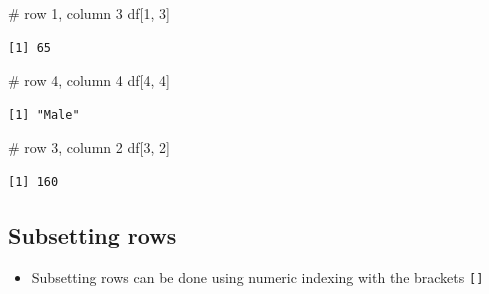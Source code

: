 \documentclass[
  letterpaper,
  DIV=11,
  numbers=noendperiod]{scrreprt}
\newenvironment{Shaded}{\begin{snugshade}}{\end{snugshade}}
\newcommand{\CommentTok}[1]{\textcolor[rgb]{0.37,0.37,0.37}{#1}}
\newcommand{\DecValTok}[1]{\textcolor[rgb]{0.68,0.00,0.00}{#1}}
\newcommand{\NormalTok}[1]{\textcolor[rgb]{0.00,0.23,0.31}{#1}}
\providecommand{\tightlist}{%
  \setlength{\itemsep}{0pt}\setlength{\parskip}{0pt}}\usepackage{longtable,booktabs,array}
\begin{document}
\begin{tcolorbox}[enhanced jigsaw, colbacktitle=quarto-callout-tip-color!10!white, opacitybacktitle=0.6, breakable, left=2mm, leftrule=.75mm, toprule=.15mm, toptitle=1mm, bottomtitle=1mm, colframe=quarto-callout-tip-color-frame, opacityback=0, coltitle=black, arc=.35mm, titlerule=0mm, colback=white, bottomrule=.15mm, title=\textcolor{quarto-callout-tip-color}{\faLightbulb}\hspace{0.5em}{Answer}, rightrule=.15mm]

\begin{Shaded}
\begin{Highlighting}[]
\CommentTok{\# row 1, column 3}
\NormalTok{df[}\DecValTok{1}\NormalTok{, }\DecValTok{3}\NormalTok{]}
\end{Highlighting}
\end{Shaded}

\begin{verbatim}
[1] 65
\end{verbatim}

\begin{Shaded}
\begin{Highlighting}[]
\CommentTok{\# row 4, column 4}
\NormalTok{df[}\DecValTok{4}\NormalTok{, }\DecValTok{4}\NormalTok{]}
\end{Highlighting}
\end{Shaded}

\begin{verbatim}
[1] "Male"
\end{verbatim}

\begin{Shaded}
\begin{Highlighting}[]
\CommentTok{\# row 3, column 2}
\NormalTok{df[}\DecValTok{3}\NormalTok{, }\DecValTok{2}\NormalTok{]}
\end{Highlighting}
\end{Shaded}

\begin{verbatim}
[1] 160
\end{verbatim}

\end{tcolorbox}

\subsection{Subsetting rows}\label{subsetting-rows}

\begin{itemize}
\tightlist
\item
  Subsetting rows can be done using numeric indexing with the brackets
  \texttt{{[}{]}}
\end{itemize}
\end{document}
